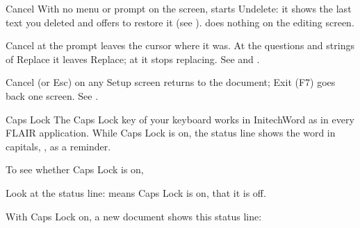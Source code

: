 \begin{Feature}{Cancel}
With no menu or prompt on the screen,  starts Undelete: it
shows the last text you deleted and offers to restore it (see
).   does nothing on the editing screen.

Cancel at the  prompt leaves the cursor where it was.  At the
questions and strings of Replace it leaves Replace; at
 it stops replacing.  See  and
.

Cancel (or Esc) on any Setup screen returns to the document; Exit (F7)
goes back one screen.  See .

\end{Feature}

\begin{Feature}{Caps Lock}
The Caps Lock key of your keyboard works in InitechWord as in every FLAIR
application.  While Caps Lock is on, the status line shows the word
 in capitals, , as a reminder.

To see whether Caps Lock is on,
\begin{WPSteps}
\item Look at the status line:  means Caps Lock is on, 
that it is off.
\end{WPSteps}

%
With Caps Lock on, a new document shows this status line:
%
\EndReplay

\end{Feature}

